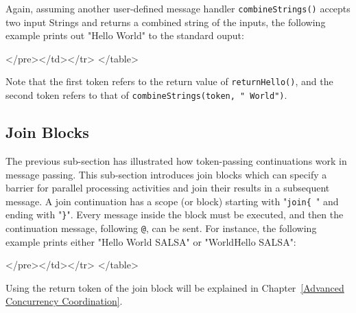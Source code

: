 Again, assuming another user-defined message handler 
{\tt combineStrings()}
accepts two input Strings and returns a combined string of the 
inputs, the following example prints out "Hello World" 
to the standard ouput:
{\singlespace

}
\begin{htmlonly}

 \begin{rawhtml} 
   </pre></td></tr>
  </table>
\end{rawhtml} 
\end{htmlonly} 
 
Note that the first token refers to the return value of 
{\tt returnHello()}, and the second token refers to that of 
{\tt combineStrings(token, " World")}.

\subsection{Join Blocks}
\label{Join Blocks}
The previous sub-section has illustrated how token-passing 
continuations work in message passing.  
This sub-section introduces join blocks 
which can specify a barrier for parallel processing activities and 
join their results in a subsequent message. A join continuation has a scope (or block) 
starting with "{\tt join\{ }" and ending with "{\tt \}}". 
Every message inside the block must be executed, 
and then the continuation message, following {\tt @}, can be sent. 
For instance, the following example prints 
either "Hello World SALSA" or "WorldHello  SALSA":

{\singlespace

}
\begin{htmlonly}

 \begin{rawhtml} 
   </pre></td></tr>
  </table>
\end{rawhtml} 
\end{htmlonly} 
 
Using the return token of the join block will be explained in 
Chapter~\ref{Advanced Concurrency Coordination}.

